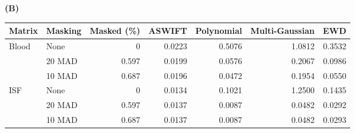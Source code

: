 \begin{table}[H]
  \bigskip
  \textbf{(B)}\par\smallskip
  \setlength{\tabcolsep}{3pt}
  \begin{tabular}{l l r r r r r}
    \hline
    Matrix & Masking & Masked (\%) & ASWIFT & Polynomial & Multi-Gaussian & EWD \\
    \hline
    Blood & None & 0 & 0.0223 & 0.5076 & 1.0812 & 0.3532 \\
     & 20 MAD & 0.597 & 0.0199 & 0.0576 & 0.2067 & 0.0986 \\
     & 10 MAD & 0.687 & 0.0196 & 0.0472 & 0.1954 & 0.0550 \\
    ISF & None & 0 & 0.0134 & 0.1021 & 1.2500 & 0.1435 \\
     & 20 MAD & 0.597 & 0.0137 & 0.0087 & 0.0482 & 0.0292 \\
     & 10 MAD & 0.687 & 0.0137 & 0.0087 & 0.0482 & 0.0293 \\
    \hline
  \end{tabular}
\end{table}
